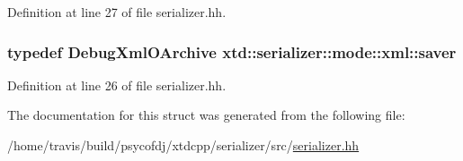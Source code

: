 Definition at line 27 of file serializer.\-hh.

\hypertarget{structxtd_1_1serializer_1_1mode_1_1xml_a630743906b9808c209a9d7bce84427bc}{
\subsubsection[{saver}]{\setlength{\rightskip}{0pt plus 5cm}typedef {\bf Debug\-Xml\-O\-Archive} {\bf xtd\-::serializer\-::mode\-::xml\-::saver}}}\label{structxtd_1_1serializer_1_1mode_1_1xml_a630743906b9808c209a9d7bce84427bc}


Definition at line 26 of file serializer.\-hh.



The documentation for this struct was generated from the following file\-:\begin{DoxyCompactItemize}
\item 
/home/travis/build/psycofdj/xtdcpp/serializer/src/\hyperlink{serializer_8hh}{serializer.\-hh}\end{DoxyCompactItemize}
